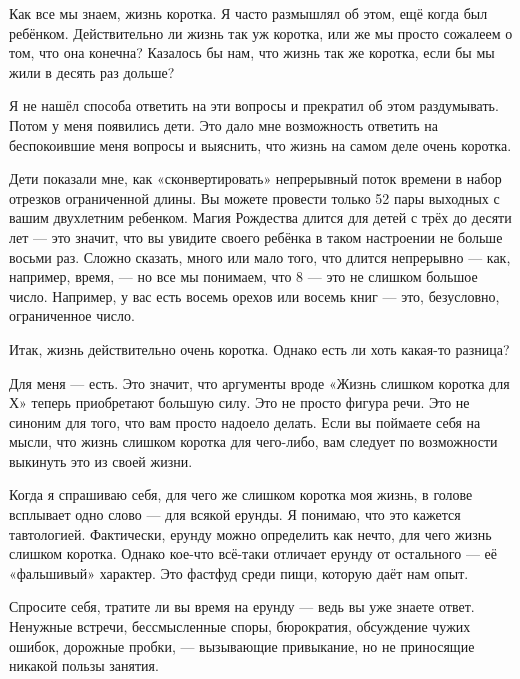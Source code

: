 \documentclass[ebook,12pt,oneside,openany]{memoir}
\begin{document}
\maketitle

Как все мы знаем, жизнь коротка. Я часто размышлял об этом, ещё когда
был ребёнком. Действительно ли жизнь так уж коротка, или же мы просто
сожалеем о том, что она конечна? Казалось бы нам, что жизнь так же
коротка, если бы мы жили в десять раз дольше? \newline

Я не нашёл способа ответить на эти вопросы и прекратил об этом
раздумывать. Потом у меня появились дети. Это дало мне возможность
ответить на беспокоившие меня вопросы и выяснить, что жизнь на самом
деле очень коротка. \newline

Дети показали мне, как «сконвертировать» непрерывный поток времени в
набор отрезков ограниченной длины. Вы можете провести только 52 пары
выходных с вашим двухлетним ребенком. Магия Рождества длится для детей
с трёх до десяти лет — это значит, что вы увидите своего ребёнка в
таком настроении не больше восьми раз. Сложно сказать, много или мало
того, что длится непрерывно — как, например, время, — но все мы
понимаем, что 8 — это не слишком большое число. Например, у вас есть
восемь орехов или восемь книг — это, безусловно, ограниченное число. \newline

Итак, жизнь действительно очень коротка. Однако есть ли хоть какая-то
разница? \newline

Для меня — есть. Это значит, что аргументы вроде «Жизнь слишком
коротка для Х» теперь приобретают большую силу. Это не просто фигура
речи. Это не синоним для того, что вам просто надоело делать. Если вы
поймаете себя на мысли, что жизнь слишком коротка для чего-либо, вам
следует по возможности выкинуть это из своей жизни. \newline

Когда я спрашиваю себя, для чего же слишком коротка моя жизнь, в
голове всплывает одно слово — для всякой ерунды. Я понимаю, что это
кажется тавтологией. Фактически, ерунду можно определить как нечто,
для чего жизнь слишком коротка. Однако кое-что всё-таки отличает
ерунду от остального — её «фальшивый» характер. Это фастфуд среди
пищи, которую даёт нам опыт. \newline

Спросите себя, тратите ли вы время на ерунду — ведь вы уже знаете
ответ. Ненужные встречи, бессмысленные споры, бюрократия, обсуждение
чужих ошибок, дорожные пробки, — вызывающие привыкание, но не
приносящие никакой пользы занятия. \newline
\end{document}

